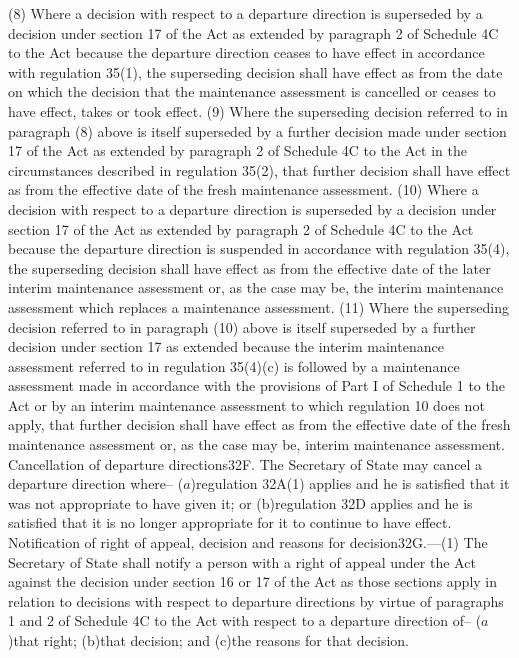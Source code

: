 \documentclass[12pt,a4paper]{article}
\begin{document}
(8) Where a decision with respect to a departure direction is superseded by a decision under section 17 of the Act as extended by paragraph 2 of Schedule 4C to the Act because the departure direction ceases to have effect in accordance with regulation 35(1), the superseding decision shall have effect as from the date on which the decision that the maintenance assessment is cancelled or ceases to have effect, takes or took effect.
(9) Where the superseding decision referred to in paragraph (8) above is itself superseded by a further decision made under section 17 of the Act as extended by paragraph 2 of Schedule 4C to the Act in the circumstances described in regulation 35(2), that further decision shall have effect as from the effective date of the fresh maintenance assessment.
(10) Where a decision with respect to a departure direction is superseded by a decision under section 17 of the Act as extended by paragraph 2 of Schedule 4C to the Act because the departure direction is suspended in accordance with regulation 35(4), the superseding decision shall have effect as from the effective date of the later interim maintenance assessment or, as the case may be, the interim maintenance assessment which replaces a maintenance assessment.
(11) Where the superseding decision referred to in paragraph (10) above is itself superseded by a further decision under section 17 as extended because the interim maintenance assessment referred to in regulation 35(4)(c) is followed by a maintenance assessment made in accordance with the provisions of Part I of Schedule 1 to the Act or by an interim maintenance assessment to which regulation 10 does not apply, that further decision shall have effect as from the effective date of the fresh maintenance assessment or, as the case may be, interim maintenance assessment.
Cancellation of departure directions32F.  The Secretary of State may cancel a departure direction where–
($a$)regulation 32A(1) applies and he is satisfied that it was not appropriate to have given it; or
(b)regulation 32D applies and he is satisfied that it is no longer appropriate for it to continue to have effect.
Notification of right of appeal, decision and reasons for decision32G.—(1) The Secretary of State shall notify a person with a right of appeal under the Act against the decision under section 16 or 17 of the Act as those sections apply in relation to decisions with respect to departure directions by virtue of paragraphs 1 and 2 of Schedule 4C to the Act with respect to a departure direction of–
($a$)that right;
(b)that decision; and
(c)the reasons for that decision.
\end{document}
